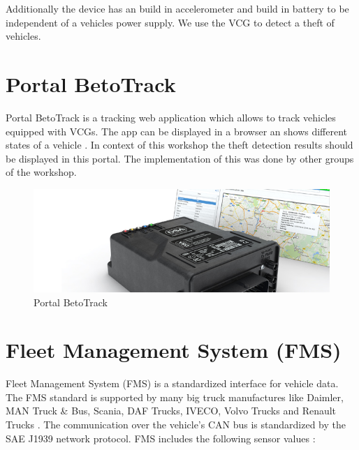 Additionally the device has an build in accelerometer and build in battery to be independent of a vehicles power supply. We use the VCG to detect a theft of vehicles.

\section{Portal BetoTrack}
\label{sec::Portal}

Portal BetoTrack is a tracking web application which allows to track vehicles equipped with VCGs. The app can be displayed in a browser an shows different states of a vehicle \cite{BetoTrack}. 
In context of this workshop the theft detection results should be displayed in this portal. The implementation of this was done by other groups of the workshop.

\begin{figure}[h]
    \includegraphics[width=1.0\textwidth]{src/pic/betotrack_630x220px.jpg}
    \caption{Portal BetoTrack \cite{BetoTrack}} 
\end{figure}

\section{Fleet Management System (FMS)}
\label{sec::FMSDef}

Fleet Management System (FMS) is a standardized interface for vehicle data. The FMS standard is supported by many big truck manufactures like Daimler, MAN Truck \& Bus, Scania, DAF Trucks, IVECO, Volvo Trucks and Renault Trucks \cite{FMS}.
The communication over the vehicle's CAN bus is standardized by the SAE J1939 network protocol.
FMS includes the following sensor values \cite{FMSStd}:

